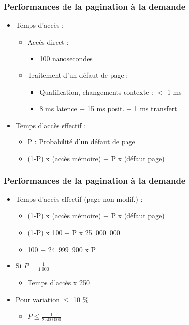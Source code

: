 \begin{frame}
\frametitle{Performances de la pagination à la demande}
\begin{itemize}
\item Temps d'accès :
\begin{itemize}
\item Accès direct :
\begin{itemize}
\item 100 nanosecondes
\end{itemize}
\item Traitement d'un défaut de page :
\begin{itemize}
\item Qualification, changements contexte : $<$ 1 ms
\item 8 ms latence + 15 ms posit. + 1 ms transfert
\end{itemize}
\end{itemize}
\item Temps d'accès effectif :
\begin{itemize}
\item P : Probabilité d'un défaut de page
\item (1-P) x (accès mémoire) + P x (défaut page)
\end{itemize}
\end{itemize}
\end{frame}


\begin{frame}
\frametitle{Performances de la pagination à la demande}
\begin{itemize}
\item Temps d’accès effectif (page non modif.) :
\begin{itemize}
\item (1-P) x (accès mémoire) + P x (défaut page)
\item (1-P) x 100 + P x 25~000~000
\item 100 + 24~999~900 x P
\end{itemize}
\item Si $P = \frac{1}{1~000}$
\begin{itemize}
\item Temps d'accès x 250
\end{itemize}
\item Pour variation $\le$ 10 \%
\begin{itemize}
\item $P \le \frac{1}{2~500~000}$
\end{itemize}
\end{itemize}
\end{frame}


